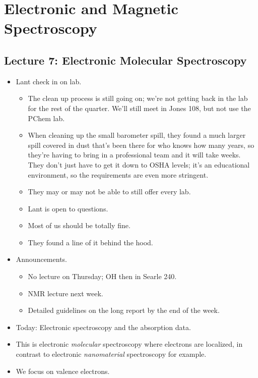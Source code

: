 \documentclass[../notes.tex]{subfiles}
\begin{document}
\chapter{Electronic and Magnetic Spectroscopy}
\section{Lecture 7: Electronic Molecular Spectroscopy}
\begin{itemize}
    \item {}Lant check in on lab.
    \begin{itemize}
        \item The clean up process is still going on; we're not getting back in the lab for the rest of the quarter. We'll still meet in Jones 108, but not use the PChem lab.
        \item When cleaning up the small barometer spill, they found a much larger spill covered in dust that's been there for who knows how many years, so they're having to bring in a professional team and it will take weeks. They don't just have to get it down to OSHA levels; it's an educational environment, so the requirements are even more stringent.
        \item They may or may not be able to still offer every lab.
        \item Lant is open to questions.
        \item Most of us should be totally fine.
        \item They found a line of it behind the hood.
    \end{itemize}
    \item Announcements.
    \begin{itemize}
        \item No lecture on Thursday; OH then in Searle 240.
        \item NMR lecture next week.
        \item Detailed guidelines on the long report by the end of the week.
    \end{itemize}
    \item Today: Electronic spectroscopy and the  absorption data.
    \item This is electronic \emph{molecular} spectroscopy where electrons are localized, in contrast to electronic \emph{nanomaterial} spectroscopy for example.
    \item We focus on valence electrons.
    \begin{itemize}

\end{itemize}
\end{itemize}
\end{document}
